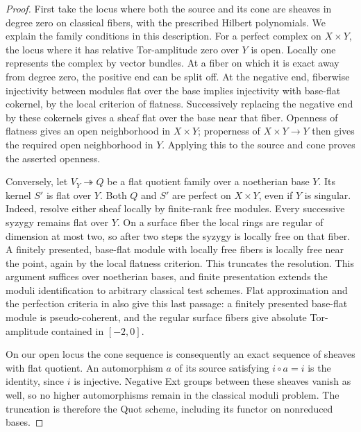 \begin{proof}
First take the locus where both the source and its cone are sheaves in
degree zero on classical fibers, with the prescribed Hilbert polynomials.
We explain the family conditions in this description.  For a perfect
complex on $X\times Y$, the locus where it has relative Tor-amplitude zero
over $Y$ is open.  Locally one represents the complex by vector bundles.
At a fiber on which it is exact away from degree zero, the positive end
can be split off.  At the negative end, fiberwise injectivity between
modules flat over the base implies injectivity with base-flat cokernel,
by the local criterion of flatness.  Successively replacing the negative
end by these cokernels gives a sheaf flat over the base near that fiber.
Openness of flatness gives an open neighborhood in $X\times Y$; properness
of $X\times Y\to Y$ then gives the required open neighborhood in $Y$.
Applying this to the source and cone proves the asserted openness.

Conversely, let $V_Y\twoheadrightarrow Q$ be a flat quotient family over
a noetherian base $Y$.  Its kernel $S'$ is flat over $Y$.  Both $Q$ and
$S'$ are perfect on $X\times Y$, even if $Y$ is singular.  Indeed, resolve
either sheaf locally by finite-rank free modules.  Every successive
syzygy remains flat over $Y$.  On a surface fiber the local rings are
regular of dimension at most two, so after two steps the syzygy is locally
free on that fiber.  A finitely presented, base-flat module with locally
free fibers is locally free near the point, again by the local flatness
criterion.  This truncates the resolution.  This argument suffices over
noetherian bases, and finite presentation extends the moduli
identification to arbitrary classical test schemes.
Flat approximation and the perfection criteria in
\cite[Tags 02JO, 0DHV, and 068X]{Stacks} also give this last passage:
a finitely presented base-flat module is pseudo-coherent, and the
regular surface fibers give absolute Tor-amplitude contained in $[-2,0]$.

On our open locus the cone sequence is consequently an exact sequence
of sheaves with flat quotient.  An automorphism $a$ of its source
satisfying $i\circ a=i$ is the identity, since $i$ is injective.
Negative Ext groups between these sheaves vanish as well, so no higher
automorphisms remain in the classical moduli problem.  The truncation
is therefore the Quot scheme, including its functor on nonreduced bases.


\end{proof}
